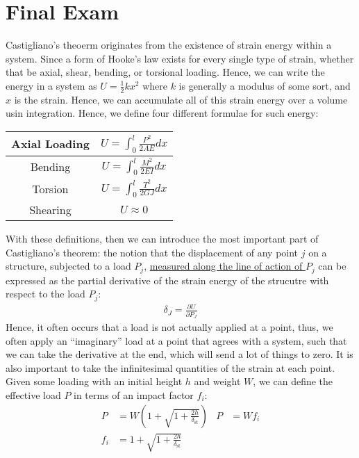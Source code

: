 \documentclass{article}
\begin{document}
\section*{Final Exam}


Castigliano's theoerm originates from the existence of strain energy within a system.
Since a form of Hooke's law exists for every single type of strain, whether that be 
axial, shear, bending, or torsional loading. Hence, we can write the energy in a 
system as $U = \frac{1}{2}kx^2$ where $k$ is generally a modulus of some sort, and $x$
is the strain. Hence, we can accumulate all of this strain energy over a volume usin 
integration. Hence, we define four different formulae for such energy:\\
{\renewcommand{\arraystretch}{2}%
\begin{tabular}{ | c | c | }
    \hline
    Axial Loading & $\displaystyle U = \int_0^l \frac{P^2}{2AE}dx$\\
    \hline 
    Bending & $\displaystyle U = \int_0^l \frac{M^2}{2EI}dx$\\
    \hline 
    Torsion & $\displaystyle U = \int_0^l \frac{T^2}{2GJ}dx$\\
    \hline
    Shearing & $\displaystyle U \approx 0$\\
    \hline
\end{tabular}}\gap
With these definitions, then we can introduce the most important part of Castigliano's theorem:
the notion that the displacement of any point $j$ on a structure, subjected to a load $P_j$,
\underline{measured along the line of action of $P_j$} can be expressed as the partial 
derivative of the strain energy of the strucutre with respect to the load $P_j$:
\begin{align*}
    \delta_J = \frac{\partial U}{\partial P_J}
\end{align*}
Hence, it often occurs that a load is not actually applied at a point, thus, we often apply
an ``imaginary'' load at a point that agrees with a system, such that we can take the 
derivative at the end, which will send a lot of things to zero.
\gap
It is also important to take the infinitesimal quantities of the strain at each point.
\gap
{}
Given some loading with an initial height $h$ and weight $W$, we can define the effective load $P$
in terms of an impact factor $f_i$:
\begin{align*}
    P &= W \left(1 + \sqrt{1 + \frac{2h}{\delta_{\textrm{st}}}}\right) & P &= Wf_i\\
    f_i &= 1 + \sqrt{1 + \frac{2h}{\delta_\textrm{st}}}
\end{align*}
\end{document}
